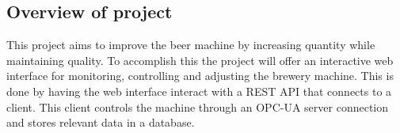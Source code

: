 \subsection{Overview of project}
This project aims to improve the beer machine by increasing quantity while 
maintaining quality. To accomplish this the project will offer an interactive 
web interface for monitoring, controlling and adjusting the brewery machine. 
This is done by having the web interface interact with a REST API that connects 
to a client. This client controls the machine through an OPC-UA server 
connection and stores relevant data in a database.
